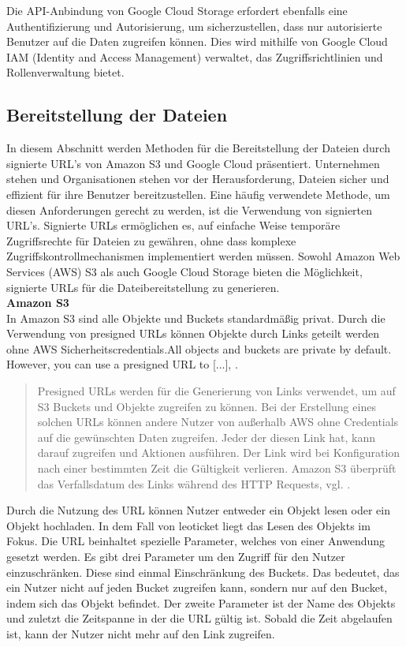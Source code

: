 Die API-Anbindung von Google Cloud Storage erfordert ebenfalls eine Authentifizierung und Autorisierung, um sicherzustellen, dass nur autorisierte Benutzer auf die Daten zugreifen können. Dies wird mithilfe von Google Cloud IAM (Identity and Access Management) verwaltet, das Zugriffsrichtlinien und Rollenverwaltung bietet.

\newpage

\subsection{Bereitstellung der Dateien}

In diesem Abschnitt werden Methoden für die Bereitstellung der Dateien durch signierte URL's von Amazon S3 und Google Cloud präsentiert. Unternehmen stehen und Organisationen stehen vor der Herausforderung, Dateien sicher und effizient für ihre Benutzer bereitzustellen. Eine häufig verwendete Methode, um diesen Anforderungen gerecht zu werden, ist die Verwendung von signierten URL's. Signierte URLs ermöglichen es, auf einfache Weise temporäre Zugriffsrechte für Dateien zu gewähren, ohne dass komplexe Zugriffskontrollmechanismen implementiert werden müssen. Sowohl Amazon Web Services (AWS) S3 als auch Google Cloud Storage bieten die Möglichkeit, signierte URLs für die Dateibereitstellung zu generieren.\\

\textbf{Amazon S3}\\

In Amazon S3 sind alle Objekte und Buckets standardmäßig privat. Durch die Verwendung von presigned URLs können Objekte durch Links geteilt werden ohne AWS Sicherheitscredentials.\glqq All objects and buckets are private by default. However, you can use a presigned URL to [...]\grqq, \cite{aws-signed-urls}. 

\begin{quote}
	Presigned URLs werden für die Generierung von Links verwendet, um auf S3 Buckets und Objekte zugreifen zu können. Bei der Erstellung eines solchen URLs können andere Nutzer von außerhalb AWS ohne Credentials auf die gewünschten Daten zugreifen. Jeder der diesen Link hat, kann darauf zugreifen und Aktionen ausführen. Der Link wird bei Konfiguration nach einer bestimmten Zeit die Gültigkeit verlieren. Amazon S3 überprüft das Verfallsdatum des Links während des HTTP Requests, vgl. \cite{aws-signed-urls}. 
\end{quote}

Durch die Nutzung des URL können Nutzer entweder ein Objekt lesen oder ein Objekt hochladen. In dem Fall von leoticket liegt das Lesen des Objekts im Fokus. Die URL beinhaltet spezielle Parameter, welches von einer Anwendung gesetzt werden. Es gibt drei Parameter um den Zugriff für den Nutzer einzuschränken. Diese sind einmal Einschränkung des Buckets. Das bedeutet, das ein Nutzer nicht auf jeden Bucket zugreifen kann, sondern nur auf den Bucket, indem sich das Objekt befindet. Der zweite Parameter ist der Name des Objekts und zuletzt die Zeitspanne in der die URL gültig ist. Sobald die Zeit abgelaufen ist, kann der Nutzer nicht mehr auf den Link zugreifen.\\

